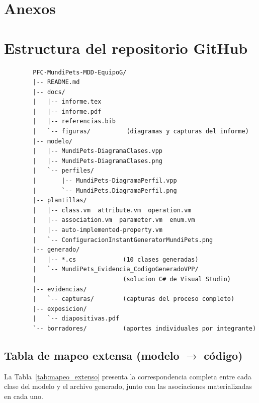\documentclass[journal,onecolumn]{IEEEtran}
\begin{document}
	\printbibliography[heading=none]
	
	\newpage
	
	\section*{Anexos}
	
	\section*{Estructura del repositorio GitHub}
	
	\begin{verbatim}
		PFC-MundiPets-MDD-EquipoG/
		|-- README.md
		|-- docs/
		|   |-- informe.tex
		|   |-- informe.pdf
		|   |-- referencias.bib
		|   `-- figuras/          (diagramas y capturas del informe)
		|-- modelo/
		|   |-- MundiPets-DiagramaClases.vpp
		|   |-- MundiPets-DiagramaClases.png
		|   `-- perfiles/
		|       |-- MundiPets-DiagramaPerfil.vpp
		|       `-- MundiPets.DiagramaPerfil.png
		|-- plantillas/
		|   |-- class.vm  attribute.vm  operation.vm
		|   |-- association.vm  parameter.vm  enum.vm
		|   |-- auto-implemented-property.vm
		|   `-- ConfiguracionInstantGeneratorMundiPets.png
		|-- generado/
		|   |-- *.cs             (10 clases generadas)
		|   `-- MundiPets_Evidencia_CodigoGeneradoVPP/
		|                        (solucion C# de Visual Studio)
		|-- evidencias/
		|   `-- capturas/        (capturas del proceso completo)
		|-- exposicion/
		|   `-- diapositivas.pdf
		`-- borradores/          (aportes individuales por integrante)
	\end{verbatim}
	
	\subsection*{Tabla de mapeo extensa (modelo \(\to\) código)}\label{sec:anexo_mapeo}
	
	La Tabla~\ref{tab:mapeo_extenso} presenta la correspondencia completa entre cada clase del modelo y el archivo generado, junto con las asociaciones materializadas en cada uno.
	
\end{document}
